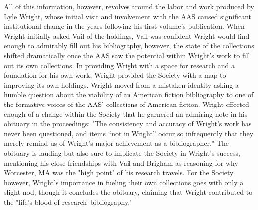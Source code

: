 All of this information, however, revolves around the labor and work produced by Lyle Wright, whose initial visit and involvement with the AAS caused significant institutional change in the years following his first volume's publication. When Wright initially asked Vail of the holdings, Vail was confident Wright would find enough to admirably fill out his bibliography, however, the state of the collections shifted dramatically once the AAS saw the potential within Wright's work to fill out its own collections. In providing Wright with a space for research and a foundation for his own work, Wright provided the Society with a map to improving its own holdings. Wright moved from a mistaken identity asking a humble question about the viability of an American fiction bibliography to one of the formative voices of the AAS' collections of American fiction. Wright effected enough of a change within the Society that he garnered an admiring note in his obituary in the proceedings: "The consistency and accuracy of Wright's work has never been questioned, and items ``not in Wright'' occur so infrequently that they merely remind us of Wright's major achievement as a bibliographer."\autocite[314-5]{roger_e._stoddard_lyle_1981} The obituary is lauding but also sure to implicate the Society in Wright's success, mentioning his close friendships with Vail and Brigham as reasoning for why Worcester, MA was the "high point" of his research travels.\autocite[314]{roger_e._stoddard_lyle_1981} For the Society however, Wright's importance in fueling their own collections goes with only a slight nod, though it concludes the obituary, claiming that Wright contributed to the "life's blood of research--bibliography."\autocite[315]{roger_e._stoddard_lyle_1981} 



